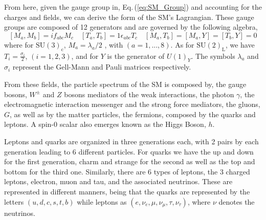 %
From here, given the gauge group in, Eq.\,(\ref{eq:SM_Group}) and accounting for the charges and fields, we can derive the form of the SM's Lagrangian. These gauge groups are composed of 12 generators and are governed by the following algebra, 
% 
\begin{equation}
\left[ M_a , M_b \right] = i f_{abc} M_c \quad \left[ T_a , T_b \right] = 1 \epsilon_{abc} T_c \quad \left[ M_a , T_b \right] = \left[ M_a , Y \right] = \left[ T_b,Y \right] = 0 
\end{equation}
%
where for $\mathrm{SU(3)_c}$, $M_a = {\lambda_a}/{2}$ , with $(a = 1, . . . , 8)$. As for $\mathrm{SU(2)_L}$, we have $T_i= \frac{\sigma_i}{2} $, $(i = 1, 2, 3)$, and for $Y$ is the generator of $U(1)_Y$. The symbols $\lambda_a$ and $\sigma_i$ represent the Gell-Mann and Pauli matrices respectively. 


From these fields, the particle spectrum of the SM is composed by, the gauge bosons, $W^\pm$ and $Z$ bosons mediators of the weak interactions, the photon $\gamma$, the electromagnetic interaction messenger and the strong force mediators, the gluons, $G$, as well as by the matter particles, the fermions, composed by the quarks and leptons. A spin-0 scalar also emerges known as the Higgs Boson, $h$. 

Leptons and quarks are organized in three generations each, with 2 pairs by each generation leading to 6 different particles. 
%
For quarks we have the up and down for the first generation, charm and strange for the second as well as the top and bottom for the third one. 
%
Similarly, there are 6 types of leptons, the 3 charged leptons, electron, muon and tau, and the associated neutrinos. These are represented in different manners, being that the quarks are represented by the letters $(u,d,c,s,t,b)$ while leptons as $(e,\nu_{e},\mu,\nu_{\mu},\tau,\nu_{\tau})$, where $\nu$ denotes the neutrinos. 

